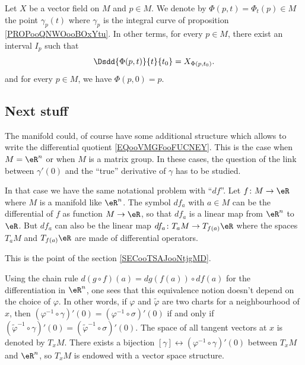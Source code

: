 Let \( X\) be a vector field on \( M\) and \( p\in M\). We denote by \( \Phi(p,t)=\Phi_t(p)\in M\) the point \( \gamma_p(t)\) where \( \gamma_p\) is the integral curve of proposition \ref{PROPooQNWOooBOxYtu}. In other terms, for every \( p\in M\), there exist an interval \( I_p\) such that
\begin{equation}
	\Dsdd{ \Phi(p,t) }{t}{t_0}=X_{\Phi(p,t_0)}.
\end{equation}
and for every \( p\in M\), we have \( \Phi(p,0)=p\).

\subsection{Next stuff}

The manifold could, of course have some additional structure which allows to write the differential quotient \eqref{EQooVMGFooFUCNEY}. This is the case when \( M=\eR^n\) or when \( M\) is a matrix group. In these cases, the question of the link between \( \gamma'(0)\) and the ``true'' derivative of \( \gamma\) has to be studied.

In that case we have the same notational problem with ``$df$''. Let \( f\colon M\to \eR\) where \( M\) is a manifold like \( \eR^n\). The symbol \( df_a\) with \( a\in M\) can be the differential of \( f\) as function \( M\to \eR\), so that \( df_a\) is a linear map from \( \eR^n\) to \( \eR\). But \( df_a\) can also be the linear map \( df_a\colon T_aM\to T_{f(a)}\eR\) where the spaces \( T_aM\) and \( T_{f(a)}\eR\) are made of differential operators.

This is the point of the section \ref{SECooTSAJooNtjgMD}.

Using the chain rule $d(g\circ f)(a)=dg(f(a))\circ df(a)$ for the differentiation in $\eR^n$, one sees that this equivalence notion doesn't depend on the choice of $\varphi$. In other words, if $\varphi$ and $\tilde{\varphi}$ are two charts for a neighbourhood of $x$, then $(\varphi^{-1} \circ\gamma)'(0)=(\varphi^{-1} \circ\sigma)'(0)$ if and only if $(\tilde{\varphi}^{-1} \circ\gamma)'(0)=(\tilde{\varphi}^{-1} \circ\sigma)'(0)$. The space of all tangent vectors at $x$ is denoted by $T_xM$. There exists a bijection $[\gamma]\leftrightarrow (\varphi^{-1}\circ\gamma)'(0)$ between $T_xM$ and $\eR^n$, so $T_xM$ is endowed with a vector space structure.

